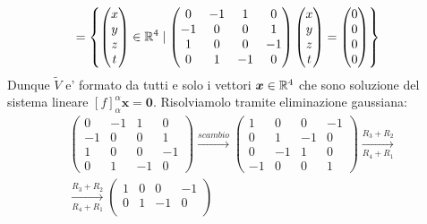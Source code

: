 \begin{solution}
\begin{enumerate}
\begin{alignat*}{1}
            &= \left\{ \begin{pmatrix}x\\y\\z\\t \end{pmatrix}\in \mathbb{R}^4 \mid \begin{pmatrix}
                0 & -1 & 1 & 0 \\ -1 & 0 & 0 & 1 \\
                1 & 0 & 0 & -1 \\ 0 & 1 & -1 & 0
            \end{pmatrix}\begin{pmatrix}x\\y\\z\\t \end{pmatrix} = \begin{pmatrix}0\\0\\0\\0 \end{pmatrix}\right\}
        \end{alignat*}
        Dunque $\widetilde{V}$ e' formato da tutti e solo i vettori $\bm{x} \in \mathbb{R}^4$ che sono soluzione del sistema lineare $[f]^{\alpha}_{\alpha}\bm{x} = \bm{0}$. Risolviamolo tramite eliminazione gaussiana:
        \begin{gather*}
            \begin{pmatrix}
                0  & -1 & 1  & 0  \\ 
                -1 & 0  & 0  & 1  \\
                1  & 0  & 0  & -1 \\ 
                0  & 1  & -1 & 0
            \end{pmatrix} \xrightarrow[]{scambio}
            \begin{pmatrix}
                1  & 0  & 0  & -1 \\
                0  & 1  & -1 & 0  \\
                0  & -1 & 1  & 0  \\ 
                -1 & 0  & 0  & 1
            \end{pmatrix} \xrightarrow[R_4 + R_1]{R_3 + R_2} \\
            \xrightarrow[R_4 + R_1]{R_3 + R_2} \begin{pmatrix}
                1  & 0  & 0  & -1 \\
                0  & 1  & -1 & 0  \\

\end{pmatrix}
\end{gather*}
\end{enumerate}
\end{solution}
